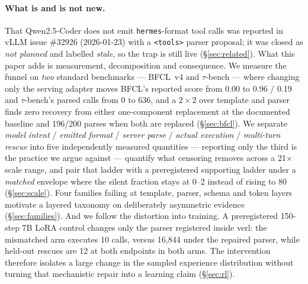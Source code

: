 \paragraph{What is and is not new.}
That Qwen2.5-Coder does not emit \texttt{hermes}-format tool calls was reported in vLLM issue
\#32926 (2026-01-23) with a \texttt{<tools>} parser proposal; it was closed as \emph{not planned}
and labelled \emph{stale}, so the trap is still live (\S\ref{sec:related}). What this paper adds is
measurement, decomposition and consequence. We measure the funnel on \emph{two} standard
benchmarks --- BFCL~v4 and $\tau$-bench --- where changing only the serving adapter moves BFCL's
reported score from 0.00 to 0.96 / 0.19 and $\tau$-bench's parsed calls from 0 to 636, and a
$2\times2$ over template and parser finds zero recovery from either one-component replacement at
the documented baseline and 196/200 parses when both are replaced (\S\ref{sec:bfcl}). We separate
\emph{model intent} / \emph{emitted format} /
\emph{server parse} / \emph{actual execution} / \emph{multi-turn rescue} into five independently
measured quantities --- reporting only the third is the practice we argue against --- quantify
what censoring removes across a 21$\times$ scale range, and pair that ladder with a preregistered
supporting ladder under a \emph{matched} envelope where the silent fraction stays at 0--2 instead of
rising to 80 (\S\ref{sec:scale}). Four families failing at template, parser, schema and token
layers motivate a layered taxonomy on deliberately asymmetric evidence (\S\ref{sec:families}). And
we follow the distortion into training. A preregistered 150-step 7B LoRA control changes only the
parser registered inside verl: the mismatched arm executes 10 calls, versus 16{,}844 under the
repaired parser, while held-out rescues are 12 at both endpoints in both arms. The intervention therefore
isolates a large change in the sampled experience distribution without turning that mechanistic
repair into a learning claim (\S\ref{sec:rl}).
